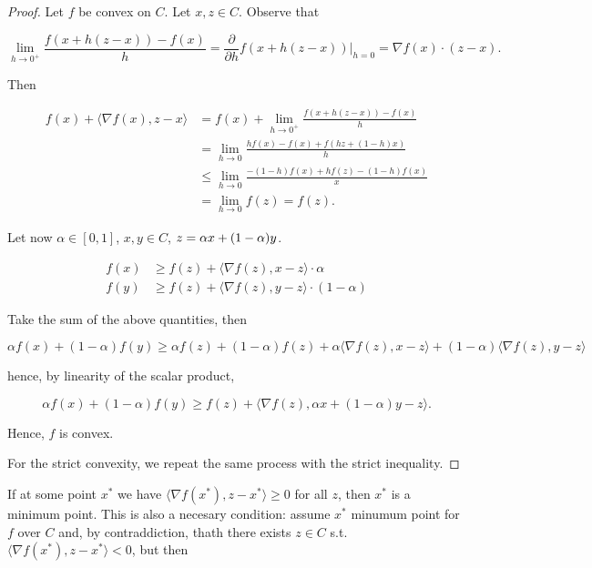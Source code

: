 \begin{proof}
    
    Let $f$ be convex on $C$. Let $x,z \in C$. Observe that 

    \[ \lim_{h \to 0^+} \frac{f(x + h(z-x)) - f(x)}{h} = \frac{\partial}{\partial h} f(x + h(z-x))|_{h=0} = \nabla f(x) \cdot (z-x). \]

    Then

    \begin{align*}
        f(x) + \langle \nabla f(x), z - x \rangle &= f(x) + \lim_{h \to 0^+} \frac{f(x + h(z-x)) - f(x)}{h} \\
        &= \lim_{h \to 0} \frac{hf(x) - f(x) + f(hz + (1-h)x)}{h} \\
        &\le \lim_{h \to 0} \frac{-(1-h)f(x) + hf(z) - (1-h)f(x)}{x} \\
        &= \lim_{h \to 0} f(z) = f(z).
    \end{align*}

    Let now $\alpha \in [0,1]$, $x,y \in C$, $z = \alpha x + (1-\alpha)y$. 

    \begin{align*}
        f(x) &\ge f(z) + \langle \nabla f(z) , x-z \rangle \cdot \alpha \\
        f(y) &\ge f(z) + \langle \nabla f(z), y-z \rangle \cdot (1-\alpha)
    \end{align*}

    Take the sum of the above quantities, then 

    \[ \alpha f(x) + (1-\alpha)f(y) \ge \alpha f(z) + (1-\alpha)f(z) + \alpha \langle \nabla f(z) , x-z \rangle + (1-\alpha) \langle \nabla f(z), y-z \rangle \]

    hence, by linearity of the scalar product, 

    \[ \alpha f(x) + (1-\alpha)f(y) \ge f(z) + \langle \nabla f(z), \alpha x + (1-\alpha)y - z \rangle. \]

    Hence, $f$ is convex.

    For the strict convexity, we repeat the same process with the strict inequality.

\end{proof}

If at some point $x^*$ we have $\langle \nabla f(x^*), z-x^*\rangle \ge 0$ for all $z$, then $x^*$ is a minimum point. This is also a necesary condition: assume $x^*$ minumum point for $f$ over $C$ and, by contraddiction, thath there exists $z \in C$ s.t. $\langle \nabla f(x^*), z-x^* \rangle < 0$, but then 

